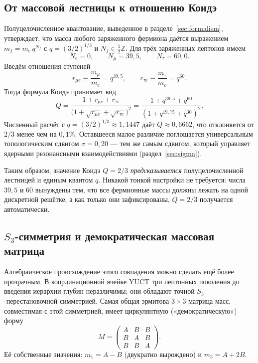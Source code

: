 \documentclass[11pt,a4paper]{article}
\begin{document}
\subsection{От массовой лестницы к отношению Коидэ}

Полуцелочисленное квантование, выведенное в разделе~\ref{sec:formalism},
утверждает, что масса любого заряженного фермиона даётся выражением
$m_f = m_e \, q^{N_f}$ с $q = (3/2)^{1/3}$ и $N_f \in \frac12\mathbb{Z}$.
Для трёх заряженных лептонов имеем
\[
N_e = 0,\qquad N_\mu = 39{,}5,\qquad N_\tau = 60{,}0 .
\]
Введём отношения ступеней
\[
r_{\mu e} \equiv \frac{m_\mu}{m_e} = q^{39{,}5},\qquad
r_{\tau e} \equiv \frac{m_\tau}{m_e} = q^{60}.
\]
Тогда формула Коидэ принимает вид
\begin{equation}
	Q = \frac{1 + r_{\mu e} + r_{\tau e}}{\bigl(1 + \sqrt{r_{\mu e}} + \sqrt{r_{\tau e}}\bigr)^2}
	= \frac{1 + q^{39{,}5} + q^{60}}{(1 + q^{19{,}75} + q^{30})^2}.
	\label{eq:Q_ladder}
\end{equation}
Численный расчёт с $q = (3/2)^{1/3} \approx 1{,}1447$ даёт
$Q \approx 0{,}6662$, что отклоняется от $2/3$ менее чем на $0{,}1\%$.
Оставшееся малое различие поглощается универсальным топологическим
сдвигом $\sigma = 0{,}20$ — тем же самым сдвигом, который управляет
ядерными резонансными взаимодействиями (раздел~\ref{sec:sigma}).

Таким образом, значение Коидэ $Q = 2/3$ \emph{предсказывается}
полуцелочисленной лестницей и единым квантом $q$.  Никакой тонкой
настройки не требуется: числа $39{,}5$ и $60$ вынуждены тем, что все
фермионные массы должны лежать на одной дискретной решётке, а как только
они зафиксированы, $Q = 2/3$ получается автоматически.

\subsection{$S_3$-симметрия и демократическая массовая матрица}

Алгебраическое происхождение этого совпадения можно сделать ещё более
прозрачным.  В координационной ячейке YUCT три лептонных поколения до
введения иерархии глубин неразличимы; они обладают точной
$S_3$-перестановочной симметрией.  Самая общая эрмитова $3\times3$-матрица
масс, совместимая с этой симметрией, имеет циркулянтную
(«демократическую») форму
\begin{equation}
	M = \begin{pmatrix}
		A & B & B \\
		B & A & B \\
		B & B & A
	\end{pmatrix}.
	\label{eq:democratic}
\end{equation}
Её собственные значения: $m_1 = A - B$ (двукратно вырождено) и $m_3 = A + 2B$.
\end{document}
